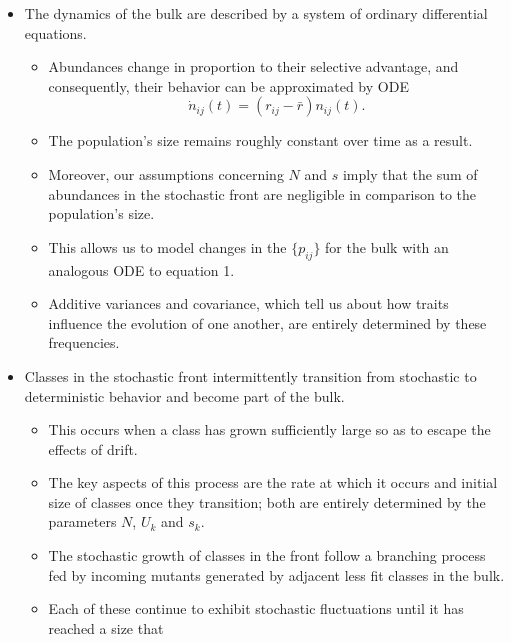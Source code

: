 \documentclass[11pt,one column]{article}
\begin{document}
\begin{itemize}
\item The dynamics of the bulk are described by a system of ordinary differential equations.
\begin{itemize}
\item Abundances change in proportion to their selective advantage, and consequently, their behavior can be approximated by ODE 
\begin{equation} 
\dot{n}_{ij}(t) = (r_{ij}-\bar{r}) n_{ij}(t). 
\end{equation}
\item The population's size remains roughly constant over time as a result.
\item Moreover, our assumptions concerning $N$ and $s$ imply that the sum of abundances in the stochastic front are negligible in comparison to the population's size.
\item This allows us to model changes in the $\{p_{ij} \}$ for the bulk with an analogous ODE to equation 1.
\item Additive variances and covariance, which tell us about how traits influence the evolution of one another, are entirely determined by these frequencies.
\end{itemize}

\item Classes in the stochastic front intermittently transition from stochastic to deterministic behavior and become part of the bulk.
\begin{itemize}
\item This occurs when a class has grown sufficiently large so as to escape the effects of drift.
\item The key aspects of this process are the rate at which it occurs and initial size of classes once they transition; both are entirely determined by the parameters $N$, $U_k$ and $s_k$. 
\item The stochastic growth of classes in the front follow a branching process fed by incoming mutants generated by adjacent less fit classes in the bulk.
\item Each of these continue to exhibit stochastic fluctuations until it has reached a size that 
\end{itemize}


\end{itemize}
\end{document}
